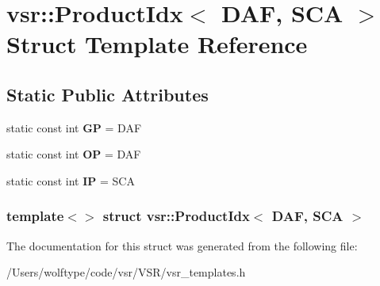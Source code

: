 \hypertarget{structvsr_1_1_product_idx_3_01_d_a_f_00_01_s_c_a_01_4}{\section{vsr\-:\-:Product\-Idx$<$ D\-A\-F, S\-C\-A $>$ Struct Template Reference}
\label{structvsr_1_1_product_idx_3_01_d_a_f_00_01_s_c_a_01_4}
}
\subsection*{Static Public Attributes}
\begin{DoxyCompactItemize}
\item 
\hypertarget{structvsr_1_1_product_idx_3_01_d_a_f_00_01_s_c_a_01_4_a3f3d1242899a36e99f0a4d2fefb117b7}{static const int {\bfseries G\-P} = D\-A\-F}\label{structvsr_1_1_product_idx_3_01_d_a_f_00_01_s_c_a_01_4_a3f3d1242899a36e99f0a4d2fefb117b7}

\item 
\hypertarget{structvsr_1_1_product_idx_3_01_d_a_f_00_01_s_c_a_01_4_ac448624366b60ccb62481756b4dcbe6c}{static const int {\bfseries O\-P} = D\-A\-F}\label{structvsr_1_1_product_idx_3_01_d_a_f_00_01_s_c_a_01_4_ac448624366b60ccb62481756b4dcbe6c}

\item 
\hypertarget{structvsr_1_1_product_idx_3_01_d_a_f_00_01_s_c_a_01_4_ae52b9f95c956efdb46dad52b155933b2}{static const int {\bfseries I\-P} = S\-C\-A}\label{structvsr_1_1_product_idx_3_01_d_a_f_00_01_s_c_a_01_4_ae52b9f95c956efdb46dad52b155933b2}

\end{DoxyCompactItemize}
\subsubsection*{template$<$$>$ struct vsr\-::\-Product\-Idx$<$ D\-A\-F, S\-C\-A $>$}



The documentation for this struct was generated from the following file\-:\begin{DoxyCompactItemize}
\item 
/\-Users/wolftype/code/vsr/\-V\-S\-R/vsr\-\_\-templates.\-h\end{DoxyCompactItemize}
